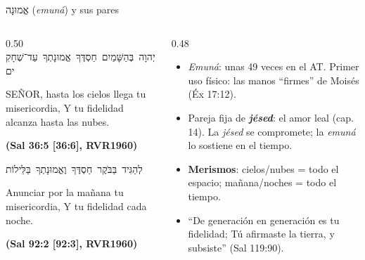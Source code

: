 \documentclass[hyperref={bookmarks=false},aspectratio=169]{beamer}
\newcommand{\heb}[1]{\mbox{\foreignlanguage{hebrew}{#1}}}
\newcommand{\SENOR}{S{\fontsize{0.78em}{1em}\selectfont EÑOR}}
\newcommand{\fuente}[1]{\par\hfill{\upshape\bfseries\footnotesize\textcolor{azul}{#1}}}
\newcommand{\destacar}[1]{\textbf{\textcolor{azul}{#1}}}
\begin{document}
\begin{frame}{\heb{אֱמוּנָה} (\emph{emuná}) y sus pares}
\begin{columns}[t,onlytextwidth]
\begin{column}{0.50\textwidth}
\centering\heb{יְהוָה בְּהַשָּׁמַיִם חַסְדֶּךָ אֱמוּנָתְךָ עַד־שְׁחָקִים}
\begin{cita}\SENOR{}, hasta los cielos llega tu misericordia, Y tu fidelidad alcanza hasta las nubes.\fuente{(Sal 36:5 [36:6], RVR1960)}\end{cita}
\centering\heb{לְהַגִּיד בַּבֹּקֶר חַסְדֶּךָ וֶאֱמוּנָתְךָ בַּלֵּילוֹת}
\begin{cita}Anunciar por la mañana tu misericordia, Y tu fidelidad cada noche.\fuente{(Sal 92:2 [92:3], RVR1960)}\end{cita}
\end{column}
\begin{column}{0.48\textwidth}\small
\begin{itemize}
\item \emph{Emuná}: unas 49 veces en el AT. Primer uso físico: las manos ``firmes'' de Moisés (Éx 17:12).
\item Pareja fija de \destacar{\emph{jésed}}: el amor leal (cap. 14). La \emph{jésed} se compromete; la \emph{emuná} lo sostiene en el tiempo.
\item \destacar{Merismos}: cielos/nubes = todo el espacio; mañana/noches = todo el tiempo.
\item ``De generación en generación es tu fidelidad; Tú afirmaste la tierra, y subsiste'' (Sal 119:90).
\end{itemize}
\end{column}
\end{columns}
\end{frame}
\end{document}
